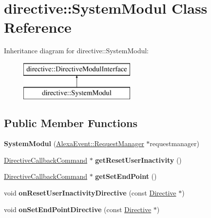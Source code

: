 \hypertarget{classdirective_1_1SystemModul}{}\section{directive\+:\+:System\+Modul Class Reference}
\label{classdirective_1_1SystemModul}
Inheritance diagram for directive\+:\+:System\+Modul\+:\begin{figure}[H]
\begin{center}
\leavevmode
\includegraphics[height=2.000000cm]{d7/dd2/classdirective_1_1SystemModul}
\end{center}
\end{figure}
\subsection*{Public Member Functions}
\begin{DoxyCompactItemize}
\item 
\mbox{\label{classdirective_1_1SystemModul_a84ca8faf01886fc1baf61fc719ec78a7}} 
{\bfseries System\+Modul} (\hyperlink{classAlexaEvent_1_1RequestManager}{Alexa\+Event\+::\+Request\+Manager} $\ast$requestmanager)
\item 
\mbox{\label{classdirective_1_1SystemModul_ad570b9a74ca0f3679b09ff8abe9de834}} 
\hyperlink{classdirective_1_1DirectiveCallbackCommand}{Directive\+Callback\+Command} $\ast$ {\bfseries get\+Reset\+User\+Inactivity} ()
\item 
\mbox{\label{classdirective_1_1SystemModul_af15d56b92761c2c57fdda904207791ca}} 
\hyperlink{classdirective_1_1DirectiveCallbackCommand}{Directive\+Callback\+Command} $\ast$ {\bfseries get\+Set\+End\+Point} ()
\item 
\mbox{\label{classdirective_1_1SystemModul_a53304f1367428289b02aee7aa54112de}} 
void {\bfseries on\+Reset\+User\+Inactivity\+Directive} (const \hyperlink{classdirective_1_1Directive}{Directive} $\ast$)
\item 
\mbox{\label{classdirective_1_1SystemModul_a90c352476ced333cc008745044d29112}} 
void {\bfseries on\+Set\+End\+Point\+Directive} (const \hyperlink{classdirective_1_1Directive}{Directive} $\ast$)
\end{DoxyCompactItemize}
